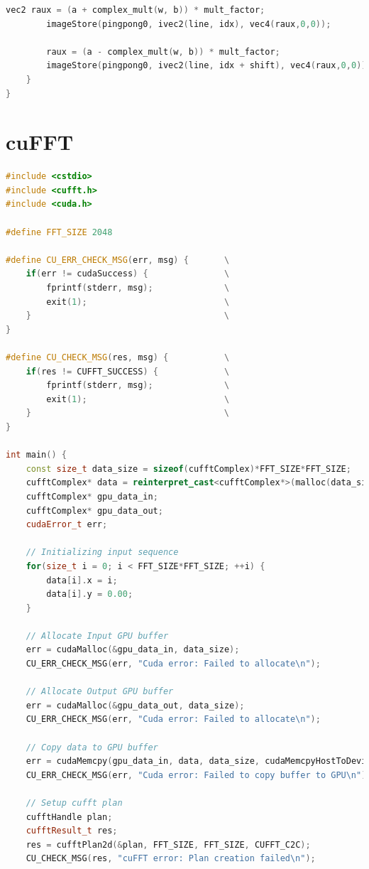 \documentclass[
  oneside,
  11pt, a4paper,
  footinclude=true,
  headinclude=true,
  cleardoublepage=empty
]{scrbook}
\begin{document}
\begin{lstlisting}[language=C,caption={FFT Cooley-Tukey Vertical stage pass, see \autoref{sec:ct-impl}},label={lst:glsl-ct-vertical}]
        vec2 raux = (a + complex_mult(w, b)) * mult_factor;
        imageStore(pingpong0, ivec2(line, idx), vec4(raux,0,0));
            
        raux = (a - complex_mult(w, b)) * mult_factor;
        imageStore(pingpong0, ivec2(line, idx + shift), vec4(raux,0,0));
    }
}
\end{lstlisting}

\chapter{cuFFT} \label{apdx:cufft}

\begin{lstlisting}[language=C++,caption={cuFFT, see \autoref{sec:cufft}},label={lst:cufft}]
#include <cstdio>
#include <cufft.h>
#include <cuda.h>

#define FFT_SIZE 2048

#define CU_ERR_CHECK_MSG(err, msg) {       \
    if(err != cudaSuccess) {               \
        fprintf(stderr, msg);              \
        exit(1);                           \
    }                                      \
}

#define CU_CHECK_MSG(res, msg) {           \
    if(res != CUFFT_SUCCESS) {             \
        fprintf(stderr, msg);              \
        exit(1);                           \
    }                                      \
}

int main() {
    const size_t data_size = sizeof(cufftComplex)*FFT_SIZE*FFT_SIZE;
    cufftComplex* data = reinterpret_cast<cufftComplex*>(malloc(data_size));
    cufftComplex* gpu_data_in;
    cufftComplex* gpu_data_out;
    cudaError_t err;
    
    // Initializing input sequence
    for(size_t i = 0; i < FFT_SIZE*FFT_SIZE; ++i) {
        data[i].x = i;
        data[i].y = 0.00;
    }
    
    // Allocate Input GPU buffer
    err = cudaMalloc(&gpu_data_in, data_size);
    CU_ERR_CHECK_MSG(err, "Cuda error: Failed to allocate\n");
    
    // Allocate Output GPU buffer
    err = cudaMalloc(&gpu_data_out, data_size);
    CU_ERR_CHECK_MSG(err, "Cuda error: Failed to allocate\n");
    
    // Copy data to GPU buffer
    err = cudaMemcpy(gpu_data_in, data, data_size, cudaMemcpyHostToDevice);
    CU_ERR_CHECK_MSG(err, "Cuda error: Failed to copy buffer to GPU\n");
    
    // Setup cufft plan
    cufftHandle plan;
    cufftResult_t res;
    res = cufftPlan2d(&plan, FFT_SIZE, FFT_SIZE, CUFFT_C2C);
    CU_CHECK_MSG(res, "cuFFT error: Plan creation failed\n");
    

\end{lstlisting}
\end{document}
